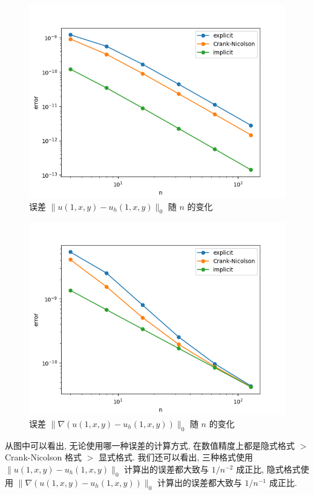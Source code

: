 \documentclass[UTF8]{article}
\begin{document}
    \begin{figure}[h]
        \centering
        \caption{误差 $\|u(1,x,y)-u_h(1,x,y)\|_0$ 随 $n$ 的变化}
        \includegraphics[width=\textwidth]{./assets/L2_error}
    \end{figure}

    \begin{figure}[h]
        \centering
        \caption{误差 $\|\nabla(u(1,x,y)-u_h(1,x,y))\|_0$ 随 $n$ 的变化}
        \includegraphics[width=\textwidth]{./assets/H1_error}
    \end{figure}

    从图中可以看出, 无论使用哪一种误差的计算方式, 在数值精度上都是隐式格式 $>$ Crank-Nicolson 格式 $>$ 显式格式.
    我们还可以看出, 三种格式使用 $\|u(1,x,y)-u_h(1,x,y)\|_0$ 计算出的误差都大致与 $1/n^{-2}$ 成正比, 隐式格式使用 $\|\nabla(u(1,x,y)-u_h(1,x,y))\|_0$ 计算出的误差都大致与 $1/n^{-1}$ 成正比.
\end{document}
